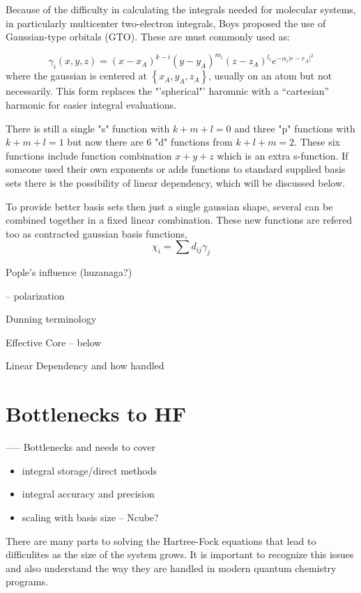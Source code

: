  Because of the difficulty in calculating the integrals needed for molecular systems, in particularly multicenter two-electron integrals, Boys\cite{Boys} proposed the use of Gaussian-type orbitals (GTO).  These are must commonly used as:

\begin{equation}
    \gamma_i(x,y,z) = \left(x-x_A\right)^{k-i} \left(y-y_A\right)^{m_i} \left(z-z_A\right)^{l_i} e^{-\alpha_i \left|r-r_A\right|^2}
\end{equation}
where the gaussian is centered at $\left\{x_A,y_A,z_A\right\}$, usually on an atom but not necessarily.  This form replaces the "'spherical"' haromnic with a "`cartesian"' harmonic for easier integral evaluations.
 
  There is still a single "s" function with $k+m+l=0$ and three "p" functions with $k+m+l=1$ but now there are 6 "d" functions from $k+l+m=2$.  These six functions include function combination $x+y+z$ which is an extra s-function.  If someone used their own exponents or adds functions to standard supplied basis sets there is the possibility of linear dependency, which will be discussed below.
  
  To provide better basis sets then just a single gaussian shape, several can be combined together in a fixed linear combination.  These new functions are refered too as contracted gaussian basis functions,
\begin{equation}
   \chi_i = \sum { d_{ij} \gamma_j }
\end{equation}

Pople's influence (huzanaga?)

 -- polarization
 

Dunning terminology

Effective Core -- below

Linear Dependency and how handled




\section{Bottlenecks to HF}

----- Bottlenecks and needs to cover
\begin{itemize}
	\item integral storage/direct methods
	\item integral accuracy and precision
	\item scaling with basis size  -- Ncube?
\end{itemize}
 There are many parts to solving the Hartree-Fock equations that lead to difficulites as the size of the system grows.  It is important to recognize this issues and also understand the way they are handled in modern quantum chemistry programs.
  
